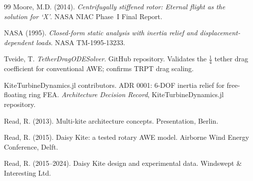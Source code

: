 \documentclass[11pt,a4paper]{article}
\begin{document}
\begin{thebibliography}{99}
Moore, M.D. (2014).
\emph{Centrifugally stiffened rotor: Eternal flight as the solution for `X'}.
NASA NIAC Phase~I Final Report.

NASA (1995).
\emph{Closed-form static analysis with inertia relief and displacement-dependent loads}.
NASA TM-1995-13233.

Tveide, T.
\emph{TetherDragODESolver}.
GitHub repository.
Validates the $\tfrac{1}{4}$ tether drag coefficient for conventional AWE; confirms TRPT drag scaling.

KiteTurbineDynamics.jl contributors.
ADR 0001: 6-DOF inertia relief for free-floating ring FEA.
\emph{Architecture Decision Record}, KiteTurbineDynamics.jl repository.

Read, R. (2013).
Multi-kite architecture concepts.
Presentation, Berlin.

Read, R. (2015).
Daisy Kite: a tested rotary AWE model.
Airborne Wind Energy Conference, Delft.

Read, R. (2015--2024).
Daisy Kite design and experimental data.
Windswept \& Interesting Ltd.

\end{thebibliography}
\end{document}
